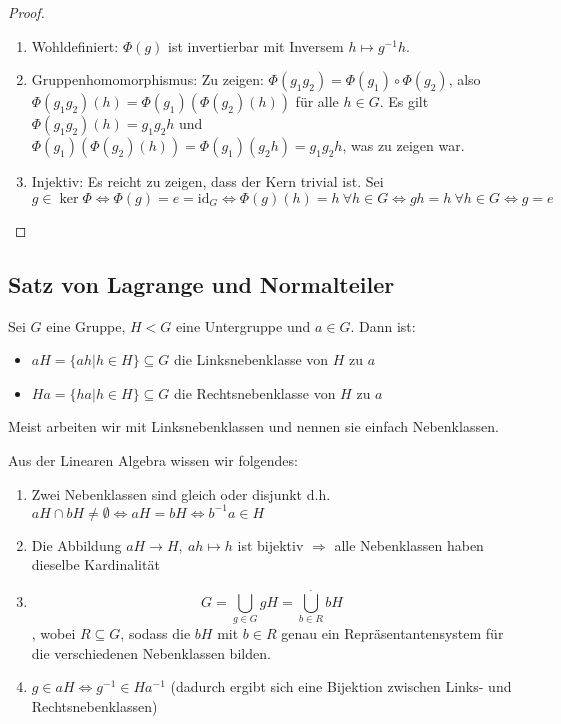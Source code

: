 \documentclass[12pt,a4paper]{scrartcl}
\begin{document}
\begin{proof}
	\leavevmode
	\begin{enumerate}
	\item Wohldefiniert: $\Phi(g)$ ist invertierbar mit Inversem $h\mapsto g^{-1}h$.	
	\item Gruppenhomomorphismus: Zu zeigen: $\Phi(g_1g_2) = \Phi(g_1)\circ \Phi(g_2)$, also $\Phi(g_1g_2)(h) = \Phi(g_1)(\Phi(g_2)(h))$ für alle $h\in G$. Es gilt $\Phi(g_1g_2)(h) = g_1g_2h$ und $\Phi(g_1)(\Phi(g_2)(h))  = \Phi(g_1)(g_2h) = g_1g_2h$, was zu zeigen war.
	
	\item Injektiv: Es reicht zu zeigen, dass der Kern trivial ist. Sei $g\in \ker\Phi\Leftrightarrow \Phi(g) = e = \text{id}_G \Leftrightarrow \Phi(g)(h)= h ~ \forall h\in G\Leftrightarrow gh = h ~ \forall h\in G\Leftrightarrow g= e$
	\end{enumerate}
\end{proof}


\subsection{Satz von Lagrange und Normalteiler}
\begin{defi}
	Sei $G$ eine Gruppe, $H<G$ eine Untergruppe und $a\in G$. Dann ist:
	\begin{itemize}
		\item[] $aH = \{ah|h\in H\}\subseteq G$ die Linksnebenklasse von $H$ zu $a$
		\item[] $Ha = \{ha|h\in H\}\subseteq G$ die Rechtsnebenklasse von $H$ zu $a$
	\end{itemize}
	Meist arbeiten wir mit Linksnebenklassen und nennen sie einfach Nebenklassen.
\end{defi}

\noindent
Aus der Linearen Algebra wissen wir folgendes: \begin{enumerate}
	\item Zwei Nebenklassen sind gleich oder disjunkt d.h. $aH\cap bH \neq \emptyset \Leftrightarrow aH = bH\Leftrightarrow b^{-1}a \in H$
	\item Die Abbildung $aH\to H,\ ah\mapsto h$ ist bijektiv $\Rightarrow$ alle Nebenklassen haben dieselbe Kardinalität
	\item $$ G = \bigcup\limits_{g\in G}gH = \overset{.}{\bigcup\limits_{b\in R} }bH$$, wobei $R\subseteq G$, sodass die $bH$ mit $b\in R$ genau ein Repräsentantensystem für die verschiedenen Nebenklassen bilden.
	\item $g\in aH\Leftrightarrow g^{-1}\in Ha^{-1}$ (dadurch ergibt sich eine Bijektion zwischen Links- und Rechtsnebenklassen)
	
\end{enumerate}
\end{document}
